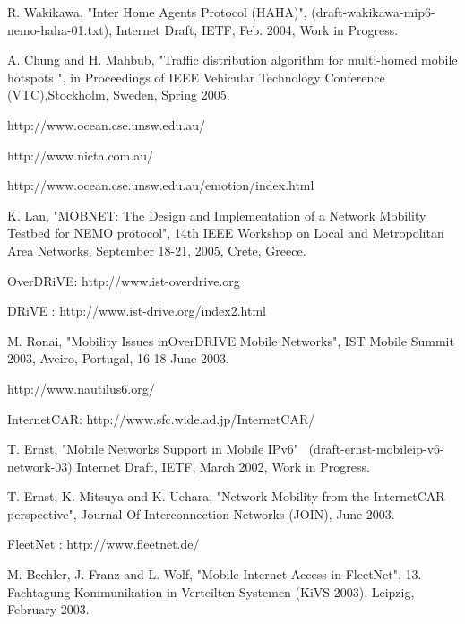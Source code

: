 \begin{thebibliography}{99}
R. Wakikawa, "Inter Home Agents Protocol (HAHA)",
(draft-wakikawa-mip6-nemo-haha-01.txt), Internet Draft, IETF, Feb.
2004, Work in Progress.

A. Chung and H. Mahbub, "Traffic distribution algorithm for
multi-homed mobile hotspots ", in Proceedings of IEEE Vehicular
Technology Conference (VTC),Stockholm, Sweden, Spring 2005.

http://www.ocean.cse.unsw.edu.au/

http://www.nicta.com.au/

http://www.ocean.cse.unsw.edu.au/emotion/index.html

K. Lan, "MOBNET: The Design and Implementation of a Network Mobility
Testbed for NEMO protocol", 14th IEEE Workshop on Local and
Metropolitan Area Networks, September 18-21, 2005, Crete, Greece.

OverDRiVE: http://www.ist-overdrive.org

DRiVE : http://www.ist-drive.org/index2.html

M. Ronai, "Mobility Issues inOverDRIVE Mobile Networks", IST Mobile
Summit 2003, Aveiro, Portugal, 16-18 June 2003.

http://www.nautilus6.org/

InternetCAR: http://www.sfc.wide.ad.jp/InternetCAR/

T. Ernst, "Mobile Networks Support in Mobile IPv6" \
(draft-ernst-mobileip-v6-network-03) Internet Draft, IETF, March
2002, Work in Progress.

T. Ernst, K. Mitsuya and K. Uehara, "Network Mobility from the
InternetCAR perspective", Journal Of Interconnection Networks
(JOIN), June 2003.

FleetNet : http://www.fleetnet.de/

M. Bechler, J. Franz and L. Wolf, "Mobile Internet Access in
FleetNet", 13. Fachtagung Kommunikation in Verteilten Systemen (KiVS
2003), Leipzig, February 2003.

\end{thebibliography}

\clearpage








